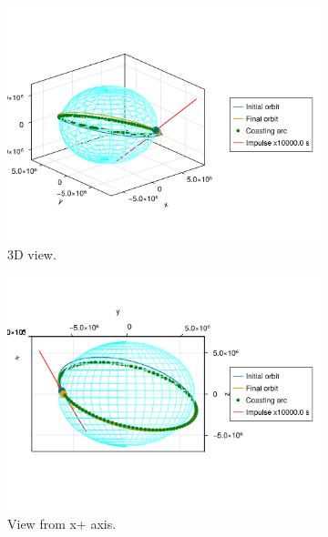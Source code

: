 \begin{figure}[htbp]
    \centering
    \begin{subfigure}{0.49\linewidth}
        \includegraphics[width=\linewidth]{../results/j2/ipv_noncop/ICI_3d.png}
        \caption{3D view.}
    \end{subfigure}
    \begin{subfigure}{0.49\linewidth}
        \includegraphics[width=\linewidth]{../results/j2/ipv_noncop/ICI_x+.png}
        \caption{View from x+ axis.}
    \end{subfigure}
    \begin{subfigure}{0.49\linewidth}

\end{subfigure}
\end{figure}
